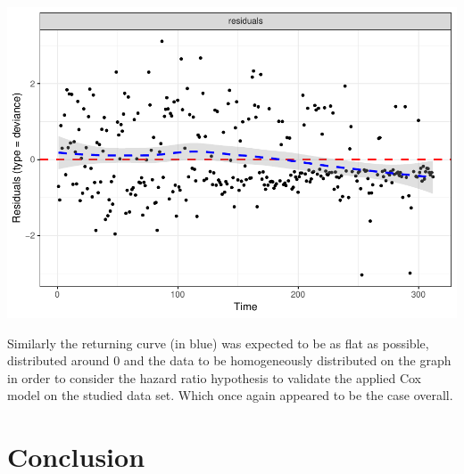 \documentclass[]{article}
\begin{document}
\includegraphics{report_files/figure-latex/unnamed-chunk-24-1.pdf}

Similarly the returning curve (in blue) was expected to be as flat as
possible, distributed around 0 and the data to be homogeneously
distributed on the graph in order to consider the hazard ratio
hypothesis to validate the applied Cox model on the studied data set.
Which once again appeared to be the case overall.

\section{Conclusion}\label{conclusion}
\end{document}
